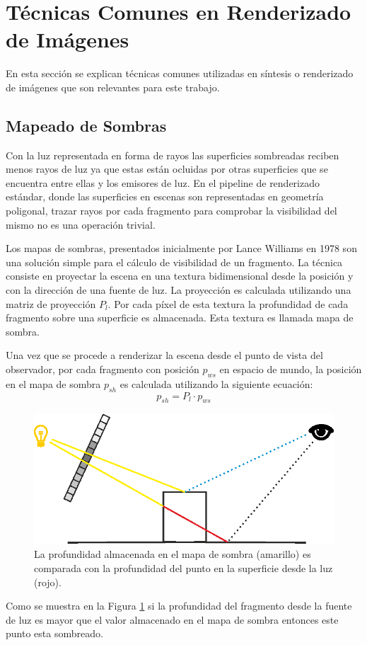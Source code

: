 \section{Técnicas Comunes en Renderizado de Imágenes}

En esta sección se explican técnicas comunes utilizadas en síntesis o renderizado de imágenes que son relevantes para este trabajo.
\subsection{Mapeado de Sombras}
\label{subsec:shadowmapping}
Con la luz representada en forma de rayos las superficies sombreadas reciben menos rayos de luz ya que estas están ocluidas por otras superficies que se encuentra entre ellas y los emisores de luz. En el pipeline de renderizado estándar, donde las superficies en escenas son representadas en geometría poligonal, trazar rayos por cada fragmento para comprobar la visibilidad del mismo no es una operación trivial.

Los mapas de sombras, presentados inicialmente por Lance Williams en 1978 \cite{Williams:78} son una solución simple para el cálculo de visibilidad de un fragmento. La técnica consiste en proyectar la escena en una textura bidimensional desde la posición y con la dirección de una fuente de luz. La proyección es calculada utilizando una matriz de proyección $P_{l}$. Por cada píxel de esta textura la profundidad de cada fragmento sobre una superficie es almacenada. Esta textura es llamada mapa de sombra.

Una vez que se procede a renderizar la escena desde el punto de vista del observador, por cada fragmento con posición $p_{ws}$ en espacio de mundo, la posición en el mapa de sombra $p_{sh}$ es calculada utilizando la siguiente ecuación:
\begin{equation}
    p_{sh} = P_{l} \cdot p_{ws}
    \label{eq:p_to_shadowmap}
\end{equation}
\begin{figure}[H]
	\centering
	\includegraphics[width=0.80\linewidth]{media/shadow_mapping.eps}
	\caption{La profundidad almacenada en el mapa de sombra (amarillo) es comparada con la profundidad del punto en la superficie desde la luz (rojo).}
	\label{fig:shadow_mapping}
\end{figure}
Como se muestra en la Figura \ref{fig:shadow_mapping} si la profundidad del fragmento desde la fuente de luz es mayor que el valor almacenado en el mapa de sombra entonces este punto esta sombreado. 

